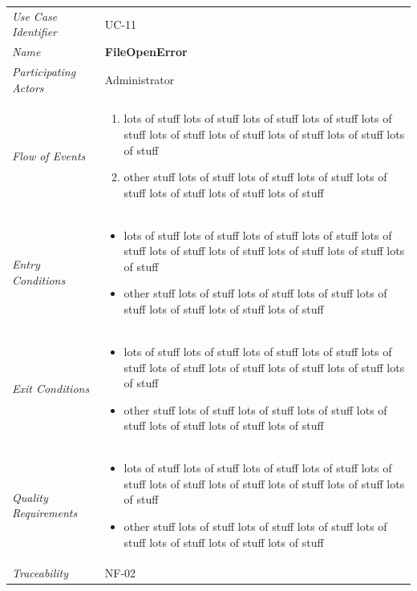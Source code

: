 \documentclass[12pt,letterpaper]{article}
\begin{document}
\begin{center}
	\begin{tabu} to 
		\toprule
		Use Case Identifier & UC-11 \\
		Name & {\bf FileOpenError} \\
		Participating Actors & Administrator \\
		Flow of Events & 
	    \begin{enumerate}[topsep=-1em]
		    \item lots of stuff lots of stuff lots of stuff lots of stuff lots of stuff lots of stuff lots of stuff lots of stuff lots of stuff lots of stuff
		    \item other stuff lots of stuff lots of stuff lots of stuff lots of stuff lots of stuff lots of stuff lots of stuff
		\end{enumerate} \\

		Entry Conditions &
		\begin{itemize}[topsep=-1em]
		    \item lots of stuff lots of stuff lots of stuff lots of stuff lots of stuff lots of stuff lots of stuff lots of stuff lots of stuff lots of stuff
		    \item other stuff lots of stuff lots of stuff lots of stuff lots of stuff lots of stuff lots of stuff lots of stuff
        \end{itemize} \\

		Exit Conditions &
		\begin{itemize}[topsep=-1em]
		    \item lots of stuff lots of stuff lots of stuff lots of stuff lots of stuff lots of stuff lots of stuff lots of stuff lots of stuff lots of stuff
		    \item other stuff lots of stuff lots of stuff lots of stuff lots of stuff lots of stuff lots of stuff lots of stuff
        \end{itemize} \\

		Quality Requirements &
		\begin{itemize}[topsep=-1em]
		    \item lots of stuff lots of stuff lots of stuff lots of stuff lots of stuff lots of stuff lots of stuff lots of stuff lots of stuff lots of stuff
		    \item other stuff lots of stuff lots of stuff lots of stuff lots of stuff lots of stuff lots of stuff lots of stuff
        \end{itemize} \\

		Traceability & NF-02 \\
		\toprule
	\end{tabu}
\end{center}
\end{document}
